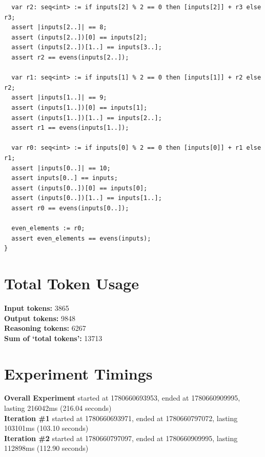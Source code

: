 \documentclass{article}
\begin{document}
\begin{lstlisting}
  var r2: seq<int> := if inputs[2] % 2 == 0 then [inputs[2]] + r3 else r3;
  assert |inputs[2..]| == 8;
  assert (inputs[2..])[0] == inputs[2];
  assert (inputs[2..])[1..] == inputs[3..];
  assert r2 == evens(inputs[2..]);

  var r1: seq<int> := if inputs[1] % 2 == 0 then [inputs[1]] + r2 else r2;
  assert |inputs[1..]| == 9;
  assert (inputs[1..])[0] == inputs[1];
  assert (inputs[1..])[1..] == inputs[2..];
  assert r1 == evens(inputs[1..]);

  var r0: seq<int> := if inputs[0] % 2 == 0 then [inputs[0]] + r1 else r1;
  assert |inputs[0..]| == 10;
  assert inputs[0..] == inputs;
  assert (inputs[0..])[0] == inputs[0];
  assert (inputs[0..])[1..] == inputs[1..];
  assert r0 == evens(inputs[0..]);

  even_elements := r0;
  assert even_elements == evens(inputs);
}
\end{lstlisting}
\section*{Total Token Usage}
\textbf{Input tokens: }3865
\\\textbf{Output tokens: }9848
\\\textbf{Reasoning tokens: }6267
\\\textbf{Sum of `total tokens': }13713
\section*{Experiment Timings}
\textbf{Overall Experiment} started at 1780660693953, ended at 1780660909995, lasting 216042ms (216.04 seconds)
\\\textbf{Iteration \#1} started at 1780660693971, ended at 1780660797072, lasting 103101ms (103.10 seconds)
\\\textbf{Iteration \#2} started at 1780660797097, ended at 1780660909995, lasting 112898ms (112.90 seconds)
\end{document}
